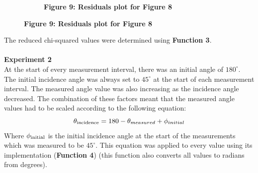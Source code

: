 \documentclass[
	letterpaper, %
	10pt, %
]{CSUniSchoolLabReport}
\begin{document}
\begin{figure}[H]
\begin{subfigure}[t]{0.45\textwidth}
		\caption{\textbf{Figure 9: Residuals plot for Figure 8}}
	\end{subfigure}
\end{figure}

The reduced chi-squared values were determined using \textbf{Function 3}.\\\\
\textbf{Experiment 2}\\
At the start of every measurement interval, there was an initial angle of $180^\circ$.
The initial incidence angle was always set to $45^\circ$ at the start of each measurement
interval. The measured angle value was also increasing as the incidence angle decreased.
The combination of these factors meant that the measured angle values had to be scaled according
to the following equation:
$$\theta_{\rm incidence} = 180-\theta_{measured} + \phi_{initial}$$
Where $\phi_{\rm initial}$ is the initial incidence angle at the start of the measurements which was measured
to be $45^\circ$. This equation was applied to every value using its implementation (\textbf{Function 4})
(this function also converts all values to radians from degrees).\\
\end{document}
